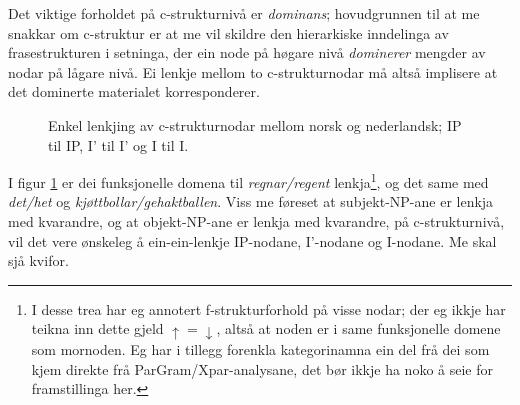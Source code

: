 \documentclass[12pt,a4paper,oneside,draft]{report}
\newcommand{\proj}[2]{\begin{tabular}{c}\footnotesize{#1}\\\normalsize{#2}\end{tabular}}
\newcommand{\ua}{\ensuremath{\uparrow}}
\newcommand{\da}{\ensuremath{\downarrow}}
\begin{document}
Det viktige forholdet på c-strukturnivå er \emph{dominans}; hovudgrunnen
til at me snakkar om c-struktur er at me vil skildre den hierarkiske
inndelinga av frasestrukturen i setninga, der ein node på høgare nivå
\emph{dominerer} mengder av nodar på lågare nivå. Ei lenkje mellom to
c-strukturnodar må altså implisere at det dominerte materialet
korresponderer.


\begin{figure}[htp]
\centering
   \caption{Enkel lenkjing av c-strukturnodar mellom norsk og
   nederlandsk; IP til IP, I' til I' og I til I.}
   \label{fig:enkel-c-lenkje}
  \end{figure}

I figur \ref{fig:enkel-c-lenkje} er dei funksjonelle domena til \emph{regnar/regent} 
lenkja\footnote{I desse trea har eg annotert f-strukturforhold på visse nodar;
       der eg ikkje har teikna inn dette gjeld $\ua=\da$, altså at
       noden er i same funksjonelle domene som mornoden. Eg har i
       tillegg forenkla kategorinamna ein del frå dei som kjem direkte
       frå ParGram/Xpar-analysane, det bør ikkje ha noko å seie for
       framstillinga her. }, og det same med \emph{det/het} og \emph{kjøttbollar/gehaktballen}. 
Viss me føreset at subjekt-NP-ane er lenkja med kvarandre, og at
objekt-NP-ane er lenkja med kvarandre, på c-strukturnivå,
vil det vere ønskeleg å ein-ein-lenkje IP-nodane, I'-nodane og
I-nodane. Me skal sjå kvifor.
\end{document}
